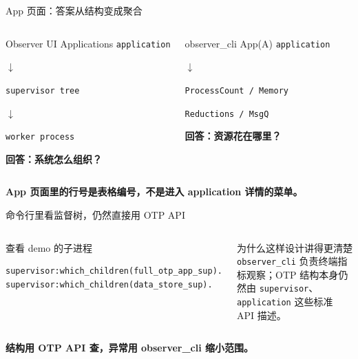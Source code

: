 \documentclass[aspectratio=169, 9pt]{beamer}
\newcommand{\good}[1]{\textbf{\color{accent!80!black}#1}}
\newcommand{\warn}[1]{\textbf{\color{warning}#1}}
\newcommand{\code}[1]{\texttt{#1}}
\begin{document}
\begin{frame}{App 页面：答案从结构变成聚合}
  \begin{columns}[T,onlytextwidth]
    \begin{block}{Observer UI Applications}
      \centering
      \code{application}\par
      $\downarrow$\par
      \code{supervisor tree}\par
      $\downarrow$\par
      \code{worker process}\par
      \vspace{0.2cm}
      \good{回答：系统怎么组织？}
    \end{block}
    \begin{exampleblock}{observer\_cli App(A)}
      \centering
      \code{application}\par
      $\downarrow$\par
      \code{ProcessCount / Memory}\par
      \code{Reductions / MsgQ}\par
      \vspace{0.2cm}
      \good{回答：资源花在哪里？}
    \end{exampleblock}
  \end{columns}
  \vspace{0.25cm}
  \centering
  \warn{App 页面里的行号是表格编号，不是进入 application 详情的菜单。}
\end{frame}

\begin{frame}[fragile]{命令行里看监督树，仍然直接用 OTP API}
  \begin{columns}[T,onlytextwidth]
    \begin{block}{查看 demo 的子进程}
\begin{lstlisting}
supervisor:which_children(full_otp_app_sup).
supervisor:which_children(data_store_sup).
\end{lstlisting}
    \end{block}
    \begin{exampleblock}{为什么这样设计讲得更清楚}
      \code{observer\_cli} 负责终端指标观察；OTP 结构本身仍然由 \code{supervisor}、\code{application} 这些标准 API 描述。
    \end{exampleblock}
  \end{columns}
  \vspace{0.25cm}
  \centering
  \good{结构用 OTP API 查，异常用 observer\_cli 缩小范围。}
\end{frame}
\end{document}
